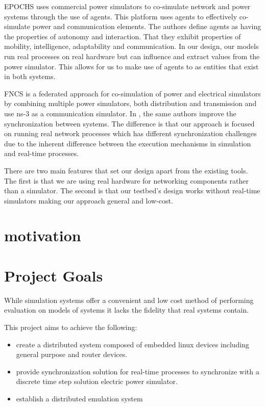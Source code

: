 EPOCHS \cite{EPOCHS} uses commercial power simulators to co-simulate network and power systems through the use of agents.
This platform uses agents to effectively co-simulate power and communication elements.
The authors define agents as having the properties of autonomy and interaction.
That they exhibit properties of mobility, intelligence, adaptability and communication.
In our design, our models run real processes on real hardware but can influence and extract values from the power simulator.
This allows for us to make use of agents to as entities that exist in both systems.

FNCS \cite{FNCS} is a federated approach for co-simulation of power and electrical simulators by combining multiple power simulators, both distribution and transmission and use ns-3 as a communication simulator.
In \cite{FNCS-algos}, the same authors improve the synchronization between systems.
The difference is that our approach is focused on running real network processes which has different synchronization challenges due to the inherent difference between the execution mechanisms in simulation and real-time processes.

There are two main features that set our design apart from the existing tools.
The first is that we are using real hardware for networking components rather than a simulator.
The second is that our testbed's design works without real-time simulators making our approach general and low-cost.



\section{motivation}
\label{motivation}
\fi


\section{Project Goals}

While simulation systems offer a convenient and low cost method of performing evaluation on models of systems it lacks the fidelity that real systems contain.

This project aims to achieve the following:
\begin{itemize}
  \item create a distributed system composed of embedded linux devices including general purpose and router devices.
  \item provide synchronization solution for real-time processes to synchronize with a discrete time step solution electric power simulator.
  \item establish a distributed emulation system
\end{itemize}


